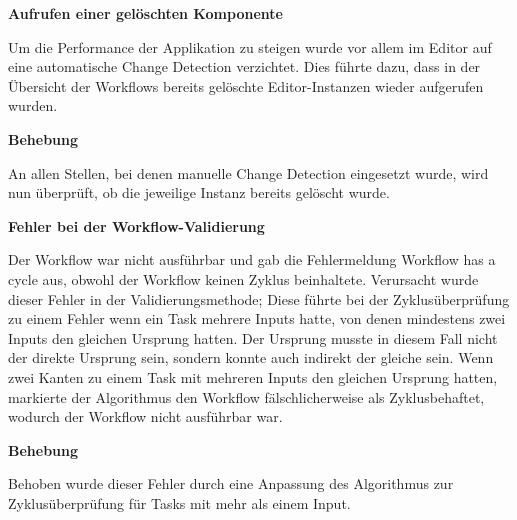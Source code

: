 \textbf{\large Aufrufen einer gelöschten Komponente}
\newline


Um die Performance der Applikation zu steigen wurde vor allem im Editor auf eine automatische Change Detection verzichtet. Dies führte dazu, dass in der Übersicht der Workflows bereits gelöschte Editor-Instanzen wieder aufgerufen wurden. 
\newline

\textbf{Behebung}
\newline


An allen Stellen, bei denen manuelle Change Detection eingesetzt wurde, wird nun überprüft, ob die jeweilige Instanz bereits gelöscht wurde.
\newline

\vspace{2em}



\textbf{\large Fehler bei der Workflow-Validierung}
\newline


Der Workflow war nicht ausführbar und gab die Fehlermeldung \glqq Workflow has a cycle\grqq{} aus, obwohl der Workflow keinen Zyklus beinhaltete. Verursacht wurde dieser Fehler in der Validierungsmethode; Diese führte bei der Zyklusüberprüfung zu einem Fehler wenn ein Task mehrere Inputs hatte, von denen mindestens zwei Inputs den gleichen Ursprung hatten. Der Ursprung musste in diesem Fall nicht der direkte Ursprung sein, sondern konnte auch indirekt der gleiche sein. Wenn zwei Kanten zu einem Task mit mehreren Inputs den gleichen Ursprung hatten, markierte der Algorithmus den Workflow fälschlicherweise als Zyklusbehaftet, wodurch der Workflow nicht ausführbar war.
\newline


\textbf{Behebung}
\newline


Behoben wurde dieser Fehler durch eine Anpassung des Algorithmus zur Zyklusüberprüfung für Tasks mit mehr als einem Input.
\newline


\vspace{2em}

